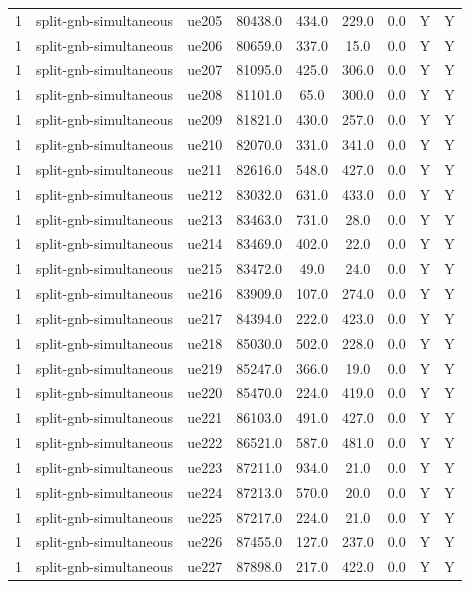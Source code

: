 \begin{table}[ht]
\begin{tabular}{|c|c|c|c|c|c|c|c|c|}
1 & split-gnb-simultaneous & ue205 & 80438.0 & 434.0 & 229.0 & 0.0 & Y & Y \\
1 & split-gnb-simultaneous & ue206 & 80659.0 & 337.0 & 15.0 & 0.0 & Y & Y \\
1 & split-gnb-simultaneous & ue207 & 81095.0 & 425.0 & 306.0 & 0.0 & Y & Y \\
1 & split-gnb-simultaneous & ue208 & 81101.0 & 65.0 & 300.0 & 0.0 & Y & Y \\
1 & split-gnb-simultaneous & ue209 & 81821.0 & 430.0 & 257.0 & 0.0 & Y & Y \\
1 & split-gnb-simultaneous & ue210 & 82070.0 & 331.0 & 341.0 & 0.0 & Y & Y \\
1 & split-gnb-simultaneous & ue211 & 82616.0 & 548.0 & 427.0 & 0.0 & Y & Y \\
1 & split-gnb-simultaneous & ue212 & 83032.0 & 631.0 & 433.0 & 0.0 & Y & Y \\
1 & split-gnb-simultaneous & ue213 & 83463.0 & 731.0 & 28.0 & 0.0 & Y & Y \\
1 & split-gnb-simultaneous & ue214 & 83469.0 & 402.0 & 22.0 & 0.0 & Y & Y \\
1 & split-gnb-simultaneous & ue215 & 83472.0 & 49.0 & 24.0 & 0.0 & Y & Y \\
1 & split-gnb-simultaneous & ue216 & 83909.0 & 107.0 & 274.0 & 0.0 & Y & Y \\
1 & split-gnb-simultaneous & ue217 & 84394.0 & 222.0 & 423.0 & 0.0 & Y & Y \\
1 & split-gnb-simultaneous & ue218 & 85030.0 & 502.0 & 228.0 & 0.0 & Y & Y \\
1 & split-gnb-simultaneous & ue219 & 85247.0 & 366.0 & 19.0 & 0.0 & Y & Y \\
1 & split-gnb-simultaneous & ue220 & 85470.0 & 224.0 & 419.0 & 0.0 & Y & Y \\
1 & split-gnb-simultaneous & ue221 & 86103.0 & 491.0 & 427.0 & 0.0 & Y & Y \\
1 & split-gnb-simultaneous & ue222 & 86521.0 & 587.0 & 481.0 & 0.0 & Y & Y \\
1 & split-gnb-simultaneous & ue223 & 87211.0 & 934.0 & 21.0 & 0.0 & Y & Y \\
1 & split-gnb-simultaneous & ue224 & 87213.0 & 570.0 & 20.0 & 0.0 & Y & Y \\
1 & split-gnb-simultaneous & ue225 & 87217.0 & 224.0 & 21.0 & 0.0 & Y & Y \\
1 & split-gnb-simultaneous & ue226 & 87455.0 & 127.0 & 237.0 & 0.0 & Y & Y \\
1 & split-gnb-simultaneous & ue227 & 87898.0 & 217.0 & 422.0 & 0.0 & Y & Y \\

\end{tabular}
\end{table}
